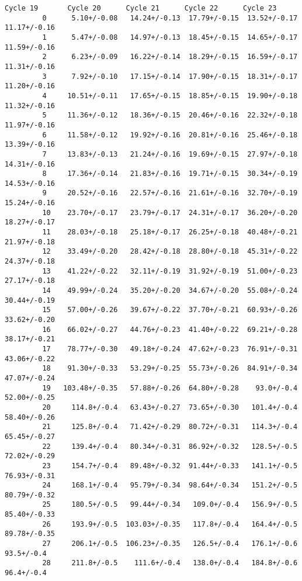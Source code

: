 \documentclass[11pt]{article}
\begin{document}
\begin{Verbatim}[commandchars=\\\{\}]
                   Cycle 19       Cycle 20      Cycle 21      Cycle 22      Cycle 23  
         0      5.10+/-0.08   14.24+/-0.13  17.79+/-0.15  13.52+/-0.17  11.17+/-0.16  
         1      5.47+/-0.08   14.97+/-0.13  18.45+/-0.15  14.65+/-0.17  11.59+/-0.16  
         2      6.23+/-0.09   16.22+/-0.14  18.29+/-0.15  16.59+/-0.17  11.31+/-0.16  
         3      7.92+/-0.10   17.15+/-0.14  17.90+/-0.15  18.31+/-0.17  11.20+/-0.16  
         4     10.51+/-0.11   17.65+/-0.15  18.85+/-0.15  19.90+/-0.18  11.32+/-0.16  
         5     11.36+/-0.12   18.36+/-0.15  20.46+/-0.16  22.32+/-0.18  11.97+/-0.16  
         6     11.58+/-0.12   19.92+/-0.16  20.81+/-0.16  25.46+/-0.18  13.39+/-0.16  
         7     13.83+/-0.13   21.24+/-0.16  19.69+/-0.15  27.97+/-0.18  14.31+/-0.16  
         8     17.36+/-0.14   21.83+/-0.16  19.71+/-0.15  30.34+/-0.19  14.53+/-0.16  
         9     20.52+/-0.16   22.57+/-0.16  21.61+/-0.16  32.70+/-0.19  15.24+/-0.16  
         10    23.70+/-0.17   23.79+/-0.17  24.31+/-0.17  36.20+/-0.20  18.27+/-0.17  
         11    28.03+/-0.18   25.18+/-0.17  26.25+/-0.18  40.48+/-0.21  21.97+/-0.18  
         12    33.49+/-0.20   28.42+/-0.18  28.80+/-0.18  45.31+/-0.22  24.37+/-0.18  
         13    41.22+/-0.22   32.11+/-0.19  31.92+/-0.19  51.00+/-0.23  27.17+/-0.18  
         14    49.99+/-0.24   35.20+/-0.20  34.67+/-0.20  55.08+/-0.24  30.44+/-0.19  
         15    57.00+/-0.26   39.67+/-0.22  37.70+/-0.21  60.93+/-0.26  33.62+/-0.20  
         16    66.02+/-0.27   44.76+/-0.23  41.40+/-0.22  69.21+/-0.28  38.17+/-0.21  
         17    78.77+/-0.30   49.18+/-0.24  47.62+/-0.23  76.91+/-0.31  43.06+/-0.22  
         18    91.30+/-0.33   53.29+/-0.25  55.73+/-0.26  84.91+/-0.34  47.07+/-0.24  
         19   103.48+/-0.35   57.88+/-0.26  64.80+/-0.28    93.0+/-0.4  52.00+/-0.25  
         20     114.8+/-0.4   63.43+/-0.27  73.65+/-0.30   101.4+/-0.4  58.40+/-0.26  
         21     125.8+/-0.4   71.42+/-0.29  80.72+/-0.31   114.3+/-0.4  65.45+/-0.27  
         22     139.4+/-0.4   80.34+/-0.31  86.92+/-0.32   128.5+/-0.5  72.02+/-0.29  
         23     154.7+/-0.4   89.48+/-0.32  91.44+/-0.33   141.1+/-0.5  76.93+/-0.31  
         24     168.1+/-0.4   95.79+/-0.34  98.64+/-0.34   151.2+/-0.5  80.79+/-0.32  
         25     180.5+/-0.5   99.44+/-0.34   109.0+/-0.4   156.9+/-0.5  85.40+/-0.33  
         26     193.9+/-0.5  103.03+/-0.35   117.8+/-0.4   164.4+/-0.5  89.78+/-0.35  
         27     206.1+/-0.5  106.23+/-0.35   126.5+/-0.4   176.1+/-0.6    93.5+/-0.4  
         28     211.8+/-0.5    111.6+/-0.4   138.0+/-0.4   184.8+/-0.6    96.4+/-0.4  

\end{Verbatim}
\end{document}
